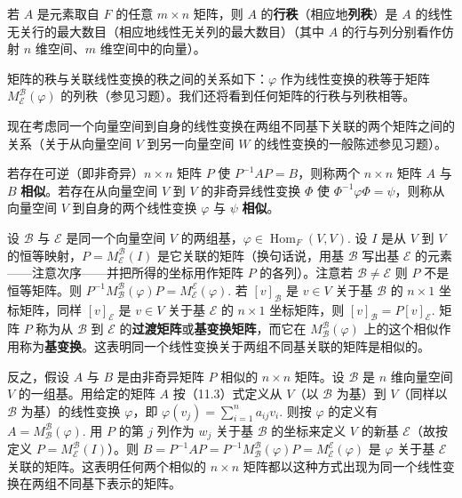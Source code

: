 \begin{definition}
若 \(A\) 是元素取自 \(F\) 的任意 \(m \times n\) 矩阵，则 \(A\) 的\textbf{行秩}（相应地\textbf{列秩}）是 \(A\) 的线性无关行的最大数目（相应地线性无关列的最大数目）（其中 \(A\) 的行与列分别看作仿射 \(n\) 维空间、\(m\) 维空间中的向量）。
\end{definition}

矩阵的秩与关联线性变换的秩之间的关系如下：\(\varphi\) 作为线性变换的秩等于矩阵 \(M_{\mathcal{E}}^{\mathcal{B}}(\varphi)\) 的列秩（参见习题）。我们还将看到任何矩阵的行秩与列秩相等。

现在考虑同一个向量空间到自身的线性变换在两组不同基下关联的两个矩阵之间的关系（关于从向量空间 \(V\) 到另一向量空间 \(W\) 的线性变换的一般陈述参见习题）。

\begin{definition}
若存在可逆（即非奇异）\(n \times n\) 矩阵 \(P\) 使 \(P^{-1}AP = B\)，则称两个 \(n \times n\) 矩阵 \(A\) 与 \(B\) \textbf{相似}。若存在从向量空间 \(V\) 到 \(V\) 的非奇异线性变换 \(\Phi\) 使 \(\Phi^{-1}\varphi\Phi = \psi\)，则称从向量空间 \(V\) 到自身的两个线性变换 \(\varphi\) 与 \(\psi\) \textbf{相似}。
\end{definition}

设 \(\mathcal{B}\) 与 \(\mathcal{E}\) 是同一个向量空间 \(V\) 的两组基，\(\varphi \in \operatorname{Hom}_F(V, V)\). 设 \(I\) 是从 \(V\) 到 \(V\) 的恒等映射，\(P = M_{\mathcal{E}}^{\mathcal{B}}(I)\) 是它关联的矩阵（换句话说，用基 \(\mathcal{B}\) 写出基 \(\mathcal{E}\) 的元素——注意次序——并把所得的坐标用作矩阵 \(P\) 的各列）。注意若 \(\mathcal{B} \neq \mathcal{E}\) 则 \(P\) 不是恒等矩阵。则 \(P^{-1}M_{\mathcal{B}}^{\mathcal{B}}(\varphi)P = M_{\mathcal{E}}^{\mathcal{E}}(\varphi)\). 若 \([v]_{\mathcal{B}}\) 是 \(v \in V\) 关于基 \(\mathcal{B}\) 的 \(n \times 1\) 坐标矩阵，同样 \([v]_{\mathcal{E}}\) 是 \(v \in V\) 关于基 \(\mathcal{E}\) 的 \(n \times 1\) 坐标矩阵，则 \([v]_{\mathcal{B}} = P[v]_{\mathcal{E}}\). 矩阵 \(P\) 称为从 \(\mathcal{B}\) 到 \(\mathcal{E}\) 的\textbf{过渡矩阵}或\textbf{基变换矩阵}，而它在 \(M_{\mathcal{B}}^{\mathcal{B}}(\varphi)\) 上的这个相似作用称为\textbf{基变换}。这表明同一个线性变换关于两组不同基关联的矩阵是相似的。

反之，假设 \(A\) 与 \(B\) 是由非奇异矩阵 \(P\) 相似的 \(n \times n\) 矩阵。设 \(\mathcal{B}\) 是 \(n\) 维向量空间 \(V\) 的一组基。用给定的矩阵 \(A\) 按（11.3）式定义从 \(V\)（以 \(\mathcal{B}\) 为基）到 \(V\)（同样以 \(\mathcal{B}\) 为基）的线性变换 \(\varphi\)，即 \(\varphi(v_j) = \sum_{i=1}^n a_{ij}v_i\). 则按 \(\varphi\) 的定义有 \(A = M_{\mathcal{B}}^{\mathcal{B}}(\varphi)\). 用 \(P\) 的第 \(j\) 列作为 \(w_j\) 关于基 \(\mathcal{B}\) 的坐标来定义 \(V\) 的新基 \(\mathcal{E}\)（故按定义 \(P = M_{\mathcal{E}}^{\mathcal{B}}(I)\)）。则 \(B = P^{-1}AP = P^{-1}M_{\mathcal{B}}^{\mathcal{B}}(\varphi)P = M_{\mathcal{E}}^{\mathcal{E}}(\varphi)\) 是 \(\varphi\) 关于基 \(\mathcal{E}\) 关联的矩阵。这表明任何两个相似的 \(n \times n\) 矩阵都以这种方式出现为同一个线性变换在两组不同基下表示的矩阵。

